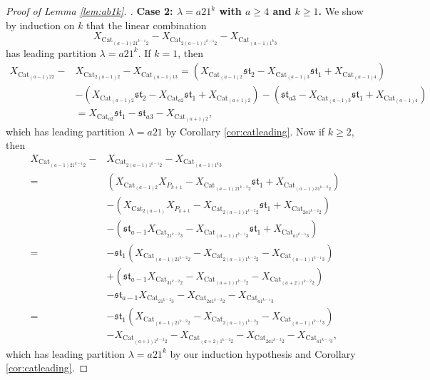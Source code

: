 \documentclass[10pt,a4paper]{amsart}
\begin{document}
\begin{proof}[Proof of Lemma \ref{lem:ab1k}. ]
\textbf{Case 2: $\lambda=a21^k$ with $a\geq 4$ and $k\geq 1$. } We show by induction on $k$ that the linear combination
\begin{equation*}
X_{\text{Cat}_{(a-1)21^{k-1}2}}-X_{\text{Cat}_{2(a-1)1^{k-1}2}}-X_{\text{Cat}_{(a-1)1^k3}}\end{equation*}
has leading partition $\lambda=a21^k$. If $k=1$, then 
\begin{align*}
X_{\text{Cat}_{(a-1)22}}-&X_{\text{Cat}_{2(a-1)2}}-X_{\text{Cat}_{(a-1)13}}=(X_{\text{Cat}_{(a-1)2}}\mathfrak{st}_2-X_{\text{Cat}_{(a-1)3}}\mathfrak{st}_1+X_{\text{Cat}_{(a-1)4}})\\&-(X_{\text{Cat}_{(a-1)2}}\mathfrak{st}_2-X_{\text{Cat}_{a2}}\mathfrak{st}_1+X_{\text{Cat}_{(a+1)2}})-(\mathfrak{st}_{a3}-X_{\text{Cat}_{(a-1)3}}\mathfrak{st}_1+X_{\text{Cat}_{(a-1)4}})\\&=X_{\text{Cat}_{a2}}\mathfrak{st}_1-\mathfrak{st}_{a3}-X_{\text{Cat}_{(a+1)2}},
\end{align*}
which has leading partition $\lambda=a21$ by Corollary \ref{cor:catleading}. Now if $k\geq 2$, then
\begin{align*}
X_{\text{Cat}_{(a-1)21^{k-1}2}}-&X_{\text{Cat}_{2(a-1)1^{k-1}2}}-X_{\text{Cat}_{(a-1)1^k3}}\\=&(X_{\text{Cat}_{(a-1)2}}X_{P_{k+1}}-X_{\text{Cat}_{(a-1)21^{k-2}2}}\mathfrak{st}_1+X_{\text{Cat}_{(a-1)31^{k-2}2}})\\
&-(X_{\text{Cat}_{2(a-1)}}X_{P_{k+1}}-X_{\text{Cat}_{2(a-1)1^{k-2}2}}\mathfrak{st}_1+X_{\text{Cat}_{2a1^{k-2}2}})\\&-(\mathfrak{st}_{a-1}X_{\text{Cat}_{21^{k-2}3}}-X_{\text{Cat}_{(a-1)1^{k-1}3}}\mathfrak{st}_1+X_{\text{Cat}_{a1^{k-1}3}})\\=&-\mathfrak{st}_1(X_{\text{Cat}_{(a-1)21^{k-2}2}}-X_{\text{Cat}_{2(a-1)1^{k-2}2}}-X_{\text{Cat}_{(a-1)1^{k-1}3}})\\&+(\mathfrak{st}_{a-1}X_{\text{Cat}_{31^{k-2}2}}-X_{\text{Cat}_{(a+1)1^{k-2}2}}-X_{\text{Cat}_{(a+2)1^{k-2}2}})\\&-\mathfrak{st}_{a-1}X_{\text{Cat}_{21^{k-2}3}}-X_{\text{Cat}_{2a1^{k-2}2}}-X_{\text{Cat}_{a1^{k-1}3}}\\=&-\mathfrak{st}_1(X_{\text{Cat}_{(a-1)21^{k-2}2}}-X_{\text{Cat}_{2(a-1)1^{k-2}2}}-X_{\text{Cat}_{(a-1)1^{k-1}3}})\\&-X_{\text{Cat}_{(a+1)1^{k-2}2}}-X_{\text{Cat}_{(a+2)1^{k-2}2}}-X_{\text{Cat}_{2a1^{k-2}2}}-X_{\text{Cat}_{a1^{k-1}3}},
\end{align*}
which has leading partition $\lambda=a21^k$ by our induction hypothesis and Corollary \ref{cor:catleading}. 


\end{proof}
\end{document}
